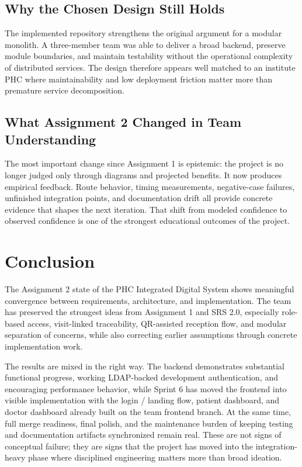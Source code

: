 \documentclass[conference]{IEEEtran}
\begin{document}
\subsection{Why the Chosen Design Still Holds}
The implemented repository strengthens the original argument for a modular monolith. A three-member team was able to deliver a broad backend, preserve module boundaries, and maintain testability without the operational complexity of distributed services. The design therefore appears well matched to an institute PHC where maintainability and low deployment friction matter more than premature service decomposition.

\subsection{What Assignment 2 Changed in Team Understanding}
The most important change since Assignment 1 is epistemic: the project is no longer judged only through diagrams and projected benefits. It now produces empirical feedback. Route behavior, timing measurements, negative-case failures, unfinished integration points, and documentation drift all provide concrete evidence that shapes the next iteration. That shift from modeled confidence to observed confidence is one of the strongest educational outcomes of the project.

\section{Conclusion}
The Assignment 2 state of the PHC Integrated Digital System shows meaningful convergence between requirements, architecture, and implementation. The team has preserved the strongest ideas from Assignment 1 and SRS 2.0, especially role-based access, visit-linked traceability, QR-assisted reception flow, and modular separation of concerns, while also correcting earlier assumptions through concrete implementation work.

The results are mixed in the right way. The backend demonstrates substantial functional progress, working LDAP-backed development authentication, and encouraging performance behavior, while Sprint 6 has moved the frontend into visible implementation with the login / landing flow, patient dashboard, and doctor dashboard already built on the team frontend branch. At the same time, full merge readiness, final polish, and the maintenance burden of keeping testing and documentation artifacts synchronized remain real. These are not signs of conceptual failure; they are signs that the project has moved into the integration-heavy phase where disciplined engineering matters more than broad ideation.
\end{document}
